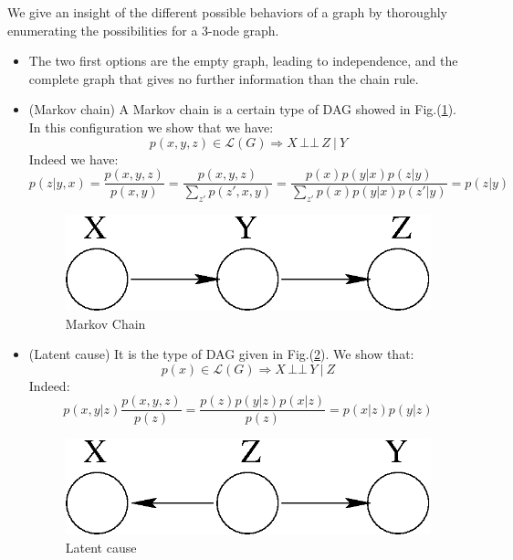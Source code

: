 \documentclass[12pt]{report}
\newcommand{\indep}{\ensuremath{\,\bot\!\!\!\bot\,}} %
\begin{document}
We give an insight of the different possible behaviors of a graph by thoroughly enumerating the possibilities for a 3-node graph. 
\begin{itemize}
	\item The two first options are the empty graph, leading to independence, and the complete graph that gives no further information than the chain rule.
	
	\item (Markov chain) A Markov chain is a certain type of DAG showed in Fig.(\ref{fig1}). In this configuration we show that we have:
	\begin{equation}
		p(x,y,z) \in \mathcal{L}(G) \Rightarrow X \indep Z\ |\ Y
	\label{eq:}
	\end{equation}
	Indeed we have:
	\begin{equation*}
	p(z|y,x) = \frac{p(x,y,z)}{p(x,y)} = \frac{p(x,y,z)}{\sum_{z'} p(z',x,y)} = \frac{p(x) p(y|x) p(z|y)}{\sum_{z'}p(x) p(y|x) p(z'|y)} = p(z|y)
	\end{equation*}
	\begin{figure}[h!]
		\centering
			\includegraphics[scale=.75]{fig1.eps}
		\caption{Markov Chain}\label{fig1}
	\end{figure}
	
	\item (Latent cause) It is the type of DAG given in Fig.(\ref{fig2}). We show that:
	\begin{equation}
		p(x) \in \mathcal{L}(G) \Rightarrow X \indep Y\ |\ Z
	\label{eq:}
	\end{equation}
	Indeed:
	\begin{equation*}
	p(x,y|z) \frac{p(x,y,z)}{p(z)} = \frac{p(z)p(y|z)p(x|z)}{p(z)} = p(x|z)p(y|z)
	\end{equation*}
	\begin{figure}[h!]
	\centering
	\includegraphics[scale=.75]{fig2.eps}
	\caption{Latent cause}
	\label{fig2}
	\end{figure}
	

\end{itemize}
\end{document}
